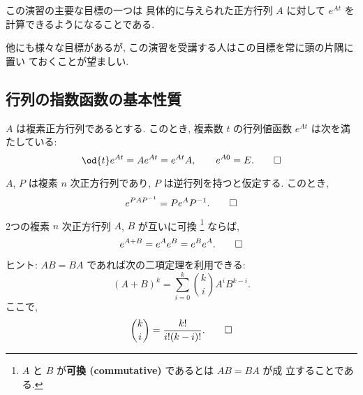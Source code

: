 \documentclass[12pt,twoside]{jarticle}
\begin{document}
{\Large この演習の主要な目標の一つは
具体的に与えられた正方行列 $A$ に対して $e^{At}$ を
計算できるようになることである.}

\bigskip

他にも様々な目標があるが, この演習を受講する人はこの目標を常に頭の片隅に置い
ておくことが望ましい.


\subsection{行列の指数函数の基本性質}
\label{sec:sec-exp-properties}


\begin{question}[8点]
  $A$ は複素正方行列であるとする. 
  このとき, 複素数 $t$ の行列値函数 $e^{At}$ は次を満たしている:
  \begin{equation*}
    \od{t}e^{At} = A e^{At} = e^{At} A,
    \qquad e^{A0} = E.
    \qed
  \end{equation*}
\end{question}


\begin{question}[8点]
  $A$, $P$ は複素 $n$ 次正方行列であり, $P$ は逆行列を持つと仮定する.
  このとき,
  \begin{equation*}
    e^{PAP^{-1}} = P e^A P^{-1}.
    \qed
  \end{equation*}
\end{question}


\begin{question}[15点]
  \label{q:exp(A+B)}
  2つの複素 $n$ 次正方行列 $A$, $B$ が互いに可換%
  \footnote{$A$ と $B$ が{\bf 可換 (commutative)} であるとは $AB = BA$ が成
    立することである.}%
  ならば,
  \begin{equation*}
    e^{A+B} = e^A e^B = e^B e^A.
    \qed
  \end{equation*}
\end{question}

\noindent
ヒント: $AB=BA$ であれば次の二項定理を利用できる:
\begin{equation*}
  (A + B)^k = \sum_{i=0}^k \binom{k}{i} A^i B^{k-i}.
\end{equation*}
ここで,
\begin{equation*}
  \binom{k}{i} = \frac{k!}{i!(k-i)!}.
\qed
\end{equation*}
\end{document}
